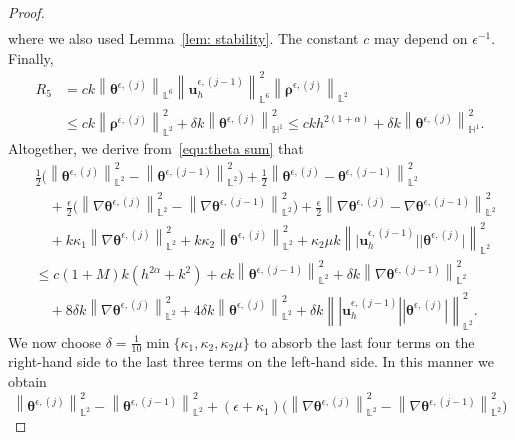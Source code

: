 \documentclass[11pt,reqno]{amsart}
\theoremstyle{definition}
\numberwithin{equation}{section}
\newcommand{\bff}{\boldsymbol}
\newcommand{\bb}{\mathbb}
\newcommand{\nn}{\nonumber}
\newcommand{\norm}[2]{\left\|{#1}\right\|_{#2}}
\begin{document}
\begin{proof}
\begin{align*}
\end{align*}
where we also used Lemma~\ref{lem: stability}. The constant $c$ may depend on $\epsilon^{-1}$.
Finally,
\begin{align*} 
	R_5
	&=
	c
	k \norm{\bff{\theta}^{\epsilon, (j)}}{\bb{L}^6}
	\norm{\bff{u}_h^{\epsilon, (j-1)}}{\bb{L}^6}^2
	\norm{\bff{\rho}^{\epsilon, (j)}}{\bb{L}^2}
	\\
    &\le
	ck 
	\norm{\bff{\rho}^{\epsilon, (j)}}{\bb{L}^2}^2
	+
	\delta k \norm{\bff{\theta}^{\epsilon, (j)}}{\bb{H}^1}^2
	\leq
	ck h^{2(1+\alpha)}
	+
	\delta k \norm{\bff{\theta}^{\epsilon, (j)}}{\bb{H}^1}^2.
\end{align*}
Altogether, we derive from~\eqref{equ:theta sum} that
\begin{align}\label{equ:the 33}
	&\frac{1}{2} 
	\Big(
	\norm{\bff{\theta}^{\epsilon, (j)}}{\bb{L}^2}^2 - \norm{\bff{\theta}^{\epsilon, (j-1)}}{\bb{L}^2}^2
	\Big)
	+
	\frac{1}{2} 
	\norm{\bff{\theta}^{\epsilon, (j)}- \bff{\theta}^{\epsilon, (j-1)}}{\bb{L}^2}^2
	\nn \\
	&\quad
	+
	\frac{\epsilon}{2} 
	\Big(
	\norm{\nabla \bff{\theta}^{\epsilon, (j)}}{\bb{L}^2}^2 - \norm{\nabla \bff{\theta}^{\epsilon, (j-1)}}{\bb{L}^2}^2
	\Big)
	+
	\frac{\epsilon}{2} \norm{\nabla \bff{\theta}^{\epsilon, (j)}- \nabla \bff{\theta}^{\epsilon, (j-1)}}{\bb{L}^2}^2
	\nn\\
	&\quad
	+
	k\kappa_1 \norm{\nabla \bff{\theta}^{\epsilon, (j)}}{\bb{L}^2}^2
	+
	k\kappa_2 \norm{\bff{\theta}^{\epsilon, (j)}}{\bb{L}^2}^2
	+
	\kappa_2 \mu k \norm{\big|\bff{u}_h^{\epsilon, (j-1)}\big| \big|\bff{\theta}^{\epsilon, (j)}\big|}{\bb{L}^2}^2
	\nn\\
	&\leq
	c(1+M) k(h^{2\alpha}+k^2) 
	+ 
	ck \norm{\bff{\theta}^{\epsilon, (j-1)}}{\bb{L}^2}^2
	+
	\delta k \norm{\nabla \bff{\theta}^{\epsilon, (j-1)}}{\bb{L}^2}^2
	\nn\\
	&\quad
	+
	8 \delta k \norm{\nabla \bff{\theta}^{\epsilon, (j)}}{\bb{L}^2}^2
	+
	4 \delta k \norm{\bff{\theta}^{\epsilon, (j)}}{\bb{L}^2}^2
	+
	\delta k
	\norm{|\bff{u}_h^{\epsilon, (j-1)}||\bff{\theta}^{\epsilon, (j)}|}{\bb{L}^2}^2.
\end{align}
We now choose $\delta=\frac{1}{10} \min\{\kappa_1,\kappa_2,\kappa_2 \mu\}$ to absorb the last four terms on the right-hand side to the last three terms on the left-hand side. In this manner we obtain 
\[
	\norm{\bff{\theta}^{\epsilon, (j)}}{\bb{L}^2}^2 
	- 
	\norm{\bff{\theta}^{\epsilon, (j-1)}}{\bb{L}^2}^2
	+
	(\epsilon+\kappa_1) \Big(\norm{\nabla\bff{\theta}^{\epsilon, (j)}}{\bb{L}^2}^2 
	- 
	\norm{\nabla\bff{\theta}^{\epsilon, (j-1)}}{\bb{L}^2}^2 \Big)
\]
\end{proof}
\end{document}
